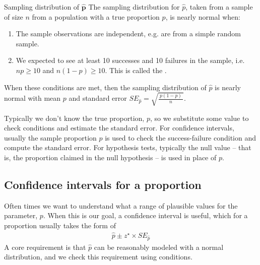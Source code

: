 \begin{onebox}{Sampling distribution of $\mathbf{\hat{p}}$}
  The sampling distribution for $\hat{p}$, taken from
  a sample of size $n$ from a population with a true
  proportion $p$, is nearly normal when:
  \begin{enumerate}
  \setlength{\itemsep}{0mm}
  \item The sample observations are independent,
      e.g. are from a simple random sample.
  \item We expected to see at least 10 successes and
      10 failures in the sample, i.e. $np\geq10$ and
      $n(1-p)\geq10$.
      This is called the .
  \end{enumerate}
  When these conditions are met, then the sampling
  distribution of $\hat{p}$ is nearly normal with mean
  $p$ and standard error
  $SE_{\hat{p}} = \sqrt{\frac{\ p(1-p)\ }{n}}$.
\end{onebox}

Typically we don't know the true proportion, $p$,
so we substitute some value to check conditions
and estimate the standard error.
For confidence intervals, usually the sample proportion
$\hat{p}$ is used to check the success-failure condition
and compute the standard error.
For hypothesis tests, typically the null value --
that is, the proportion claimed in the null hypothesis --
is used in place of $p$.


\subsection{Confidence intervals for a proportion}
\label{confIntForPropSection}


Often times we want to understand what a range of
plausible values for the parameter, $p$.
When this is our goal, a confidence interval is useful,
which for a proportion usually takes the form of
\begin{align*}
\hat{p} \pm z^{\star} \times SE_{\hat{p}}
\end{align*}
A core requirement is that $\hat{p}$ can be reasonably
modeled with a normal distribution, and we check this
requirement using conditions.


